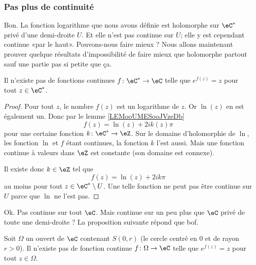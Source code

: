 \subsubsection{Pas plus de continuité}

Bon. La fonction logarithme que nous avons définie est holomorphe sur \( \eC^*\) privé d'une demi-droite \( U\). Et elle n'est pas continue sur \( U\); elle y est cependant continue «par le haut». Pouvons-nous faire mieux ? Nous allons maintenant prouver quelque résultats d'impossibilité de faire mieux que holomorphe partout sauf une partie pas si petite que ça.

\begin{proposition}
    Il n'existe pas de fonctions continues \( f\colon \eC^*\to \eC\) telle que \(  e^{f(z)}=z\) pour tout \( z\in \eC^*\).
\end{proposition}

\begin{proof}
    Pour tout \( z\), le nombre \( f(z)\) est un logarithme de \( z\). Or \( \ln(z)\) en est également un. Donc par le lemme \ref{LEMooUMESooJVzeDb} 
    \begin{equation}
        f(z)=\ln(z)+2i k(z)\pi
    \end{equation}
    pour une certaine fonction \( k\colon \eC^*\to \eZ\). Sur le domaine d'holomorphie de \( \ln\), les fonction \( \ln\) et \( f\) étant continues, la fonction \( k\) l'est aussi. Mais une fonction continue à valeurs dans \( \eZ\) est constante (son domaine est connexe).

    Il existe donc \( k\in \eZ\) tel que 
    \begin{equation}
         f(z)=\ln(z)+2ik\pi
    \end{equation}
    au moins pour tout \( z\in \eC^*\setminus U\). Une telle fonction ne peut pas être continue sur \( U\) parce que \( \ln\) ne l'est pas.
\end{proof}

Ok. Pas continue sur tout \( \eC\). Mais continue sur un peu plus que \( \eC\) privé de toute une demi-droite ? La proposition suivante répond que bof.

\begin{proposition}
    Soit \( \Omega\) un ouvert de \( \eC\) contenant \( S(0,r)\) (le cercle centré en \( 0\) et de rayon \( r>0\)). Il n'existe pas de fonction continue \( f\colon \Omega\to \eC\) telle que \(  e^{f(z)}=z\) pour tout \( z\in \Omega\).
\end{proposition}

